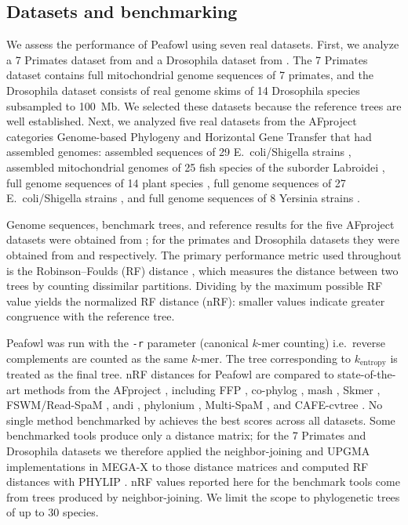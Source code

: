 \documentclass[11pt]{article}
\begin{document}
\subsection{Datasets and benchmarking}

We assess the performance of Peafowl using seven real datasets. First, we analyze a 7 Primates dataset from \cite{zielezinski2017afreview} and a Drosophila dataset from \cite{sarmashghi2019skmer}. The 7 Primates dataset contains full mitochondrial genome sequences of 7 primates, and the Drosophila dataset consists of real genome skims of 14 Drosophila species subsampled to 100~Mb. We selected these datasets because the reference trees are well established. Next, we analyzed five real datasets from the AFproject \cite{zielezinski2019afproject} categories Genome-based Phylogeny and Horizontal Gene Transfer that had assembled genomes: assembled sequences of 29 E.~coli/Shigella strains \cite{yi2013cophylog}, assembled mitochondrial genomes of 25 fish species of the suborder Labroidei \cite{fischer2013fishmito}, full genome sequences of 14 plant species \cite{hatje2012plant}, full genome sequences of 27 E.~coli/Shigella strains \cite{chan2014hgt}, and full genome sequences of 8 Yersinia strains \cite{chan2014hgt}.

Genome sequences, benchmark trees, and reference results for the five AFproject datasets were obtained from \cite{zielezinski2019afproject}; for the primates and Drosophila datasets they were obtained from \cite{zielezinski2017afreview} and \cite{sarmashghi2019skmer} respectively. The primary performance metric used throughout is the Robinson--Foulds (RF) distance \cite{robinson1981rf}, which measures the distance between two trees by counting dissimilar partitions. Dividing by the maximum possible RF value yields the normalized RF distance (nRF): smaller values indicate greater congruence with the reference tree.

Peafowl was run with the \texttt{-r} parameter (canonical $k$-mer counting) i.e.\ reverse complements are counted as the same $k$-mer. The tree corresponding to $k_{\text{entropy}}$ is treated as the final tree. nRF distances for Peafowl are compared to state-of-the-art methods from the AFproject \cite{zielezinski2019afproject}, including FFP \cite{sims2009ffp,sims2009ffpsize}, co-phylog \cite{yi2013cophylog}, mash \cite{ondov2016mash}, Skmer \cite{sarmashghi2019skmer}, FSWM/Read-SpaM \cite{leimeister2017spacedwords,leimeister2019readspam}, andi \cite{haubold2015andi}, phylonium \cite{klotzl2019phylonium}, Multi-SpaM \cite{dencker2020multispam}, and CAFE-cvtree \cite{lau2019cafe}. No single method benchmarked by \cite{zielezinski2019afproject} achieves the best scores across all datasets. Some benchmarked tools produce only a distance matrix; for the 7 Primates and Drosophila datasets we therefore applied the neighbor-joining and UPGMA implementations in MEGA-X \cite{kumar2018megax} to those distance matrices and computed RF distances with PHYLIP \cite{felsenstein1989phylip}. nRF values reported here for the benchmark tools come from trees produced by neighbor-joining. We limit the scope to phylogenetic trees of up to 30 species.
\end{document}
